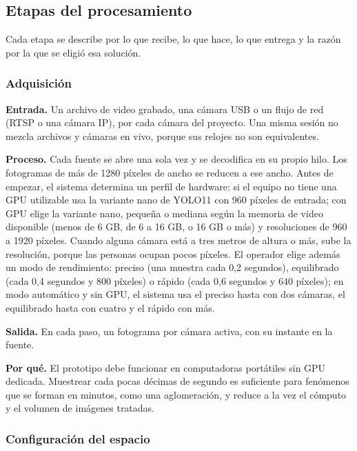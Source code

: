 \subsection{Etapas del procesamiento}
\label{subsec:met-etapas}

Cada etapa se describe por lo que recibe, lo que hace, lo que entrega y la razón por la que se
eligió esa solución.

\subsubsection{Adquisición}
\label{subsec:met-adquisicion}

\textbf{Entrada.} Un archivo de video grabado, una cámara USB o un flujo de red (RTSP o una
cámara IP), por cada cámara del proyecto. Una misma sesión no mezcla archivos y cámaras en
vivo, porque sus relojes no son equivalentes.

\textbf{Proceso.} Cada fuente se abre una sola vez y se decodifica en su propio hilo. Los
fotogramas de más de 1280 píxeles de ancho se reducen a ese ancho. Antes de empezar, el
sistema determina un perfil de hardware: si el equipo no tiene una GPU utilizable usa la
variante nano de YOLO11 con 960 píxeles de entrada; con GPU elige la variante nano, pequeña o
mediana según la memoria de video disponible (menos de 6 GB, de 6 a 16 GB, o 16 GB o más) y
resoluciones de 960 a 1920 píxeles. Cuando alguna cámara está a tres metros de altura o más,
sube la resolución, porque las personas ocupan pocos píxeles. El operador elige además un
modo de rendimiento: preciso (una muestra cada 0,2 segundos), equilibrado (cada 0,4 segundos y
800 píxeles) o rápido (cada 0,6 segundos y 640 píxeles); en modo automático y sin GPU, el
sistema usa el preciso hasta con dos cámaras, el equilibrado hasta con cuatro y el rápido con
más.

\textbf{Salida.} En cada paso, un fotograma por cámara activa, con su instante en la fuente.

\textbf{Por qué.} El prototipo debe funcionar en computadoras portátiles sin GPU dedicada.
Muestrear cada pocas décimas de segundo es suficiente para fenómenos que se forman en
minutos, como una aglomeración, y reduce a la vez el cómputo y el volumen de imágenes
tratadas.

\subsubsection{Configuración del espacio}
\label{subsec:met-configuracion}

